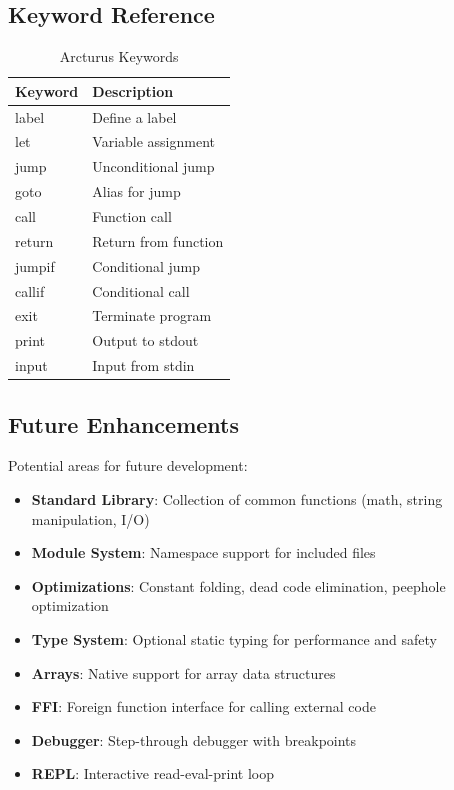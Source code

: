\documentclass[11pt,a4paper]{article}
\begin{document}
\subsection{Keyword Reference}

\begin{table}[h]
\centering
\begin{tabular}{@{}ll@{}}
\toprule
Keyword & Description \\
\midrule
label & Define a label \\
let & Variable assignment \\
jump & Unconditional jump \\
goto & Alias for jump \\
call & Function call \\
return & Return from function \\
jumpif & Conditional jump \\
callif & Conditional call \\
exit & Terminate program \\
print & Output to stdout \\
input & Input from stdin \\
\bottomrule
\end{tabular}
\caption{Arcturus Keywords}
\end{table}

\subsection{Future Enhancements}

Potential areas for future development:

\begin{itemize}
    \item \textbf{Standard Library}: Collection of common functions (math, string manipulation, I/O)
    \item \textbf{Module System}: Namespace support for included files
    \item \textbf{Optimizations}: Constant folding, dead code elimination, peephole optimization
    \item \textbf{Type System}: Optional static typing for performance and safety
    \item \textbf{Arrays}: Native support for array data structures
    \item \textbf{FFI}: Foreign function interface for calling external code
    \item \textbf{Debugger}: Step-through debugger with breakpoints
    \item \textbf{REPL}: Interactive read-eval-print loop
\end{itemize}
\end{document}
